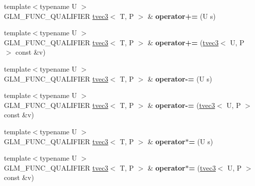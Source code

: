 \begin{DoxyCompactItemize}
\item 
{\footnotesize template$<$typename U $>$ }\\G\+L\+M\+\_\+\+F\+U\+N\+C\+\_\+\+Q\+U\+A\+L\+I\+F\+I\+ER \hyperlink{structglm_1_1detail_1_1tvec3}{tvec3}$<$ T, P $>$ \& {\bfseries operator+=} (U s)\hypertarget{structglm_1_1detail_1_1tvec3_aad607a9c90b9cadc7aa6c4ac048adcb7}{}\label{structglm_1_1detail_1_1tvec3_aad607a9c90b9cadc7aa6c4ac048adcb7}

\item 
{\footnotesize template$<$typename U $>$ }\\G\+L\+M\+\_\+\+F\+U\+N\+C\+\_\+\+Q\+U\+A\+L\+I\+F\+I\+ER \hyperlink{structglm_1_1detail_1_1tvec3}{tvec3}$<$ T, P $>$ \& {\bfseries operator+=} (\hyperlink{structglm_1_1detail_1_1tvec3}{tvec3}$<$ U, P $>$ const \&v)\hypertarget{structglm_1_1detail_1_1tvec3_af459080608fac7a3cf88684d44b10fc3}{}\label{structglm_1_1detail_1_1tvec3_af459080608fac7a3cf88684d44b10fc3}

\item 
{\footnotesize template$<$typename U $>$ }\\G\+L\+M\+\_\+\+F\+U\+N\+C\+\_\+\+Q\+U\+A\+L\+I\+F\+I\+ER \hyperlink{structglm_1_1detail_1_1tvec3}{tvec3}$<$ T, P $>$ \& {\bfseries operator-\/=} (U s)\hypertarget{structglm_1_1detail_1_1tvec3_aaffa97a8d1d5dd29ba438159fb60e0e9}{}\label{structglm_1_1detail_1_1tvec3_aaffa97a8d1d5dd29ba438159fb60e0e9}

\item 
{\footnotesize template$<$typename U $>$ }\\G\+L\+M\+\_\+\+F\+U\+N\+C\+\_\+\+Q\+U\+A\+L\+I\+F\+I\+ER \hyperlink{structglm_1_1detail_1_1tvec3}{tvec3}$<$ T, P $>$ \& {\bfseries operator-\/=} (\hyperlink{structglm_1_1detail_1_1tvec3}{tvec3}$<$ U, P $>$ const \&v)\hypertarget{structglm_1_1detail_1_1tvec3_a74d551954eaca6824359af0d741a17df}{}\label{structglm_1_1detail_1_1tvec3_a74d551954eaca6824359af0d741a17df}

\item 
{\footnotesize template$<$typename U $>$ }\\G\+L\+M\+\_\+\+F\+U\+N\+C\+\_\+\+Q\+U\+A\+L\+I\+F\+I\+ER \hyperlink{structglm_1_1detail_1_1tvec3}{tvec3}$<$ T, P $>$ \& {\bfseries operator$\ast$=} (U s)\hypertarget{structglm_1_1detail_1_1tvec3_a519058bf101092a6e09727980443a2bc}{}\label{structglm_1_1detail_1_1tvec3_a519058bf101092a6e09727980443a2bc}

\item 
{\footnotesize template$<$typename U $>$ }\\G\+L\+M\+\_\+\+F\+U\+N\+C\+\_\+\+Q\+U\+A\+L\+I\+F\+I\+ER \hyperlink{structglm_1_1detail_1_1tvec3}{tvec3}$<$ T, P $>$ \& {\bfseries operator$\ast$=} (\hyperlink{structglm_1_1detail_1_1tvec3}{tvec3}$<$ U, P $>$ const \&v)\hypertarget{structglm_1_1detail_1_1tvec3_a1d2ab1093230a4404781d65564e4f7d0}{}\label{structglm_1_1detail_1_1tvec3_a1d2ab1093230a4404781d65564e4f7d0}


\end{DoxyCompactItemize}
